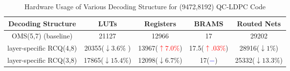 \begin{table*}[t]
    \centering
    \caption{\label{tab: hardware_usage_1} Hardware Usage of Various Decoding Structure for (9472,8192) QC-LDPC Code }
    \begin{tabular}{|c|c|c|c|c|}
    \hline
    Decoding Structure & LUTs                       & Registers                  & BRAMS                        & Routed Nets                \\ \hline
    OMS(5,7) (baseline)          & 21127                      & 12966                     & 17                    & 29202                      \\ \hline
    layer-specific RCQ(4,8)           & 20355(\textcolor{mygreen}{$\downarrow 3.6\%$} ) & 13967(\textcolor{red}{$\uparrow 7.0\%$}) & 17.5(\textcolor{red}{$\uparrow .03\%$}) & 28916(\textcolor{mygreen}{$\downarrow 1\%$}) \\ \hline
    layer-specific RCQ(3,8)           & 17865(\textcolor{mygreen}{$\downarrow 15.4\%$}) & 12098(\textcolor{mygreen}{$\downarrow 6.7\%$}) & 17(\textcolor{blue}{$-$})                &  25332\textcolor{mygreen}{($\downarrow 13.3\%$}) \\ \hline
    \end{tabular}
    \end{table*}